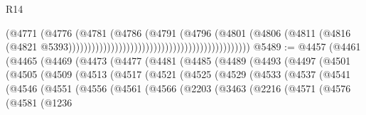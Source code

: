 \begin{lexlean}{R14}
\begin{coremodule}
                                                                            (@4771
                                                                              (@4776
                                                                                (@4781
                                                                                  (@4786
                                                                                    (@4791
                                                                                      (@4796
                                                                                        (@4801
                                                                                          (@4806
                                                                                            (@4811
                                                                                              (@4816
                                                                                                (@4821
                                                                                                  @5393)))))))))))))))))))))))))))))))))))))))))))))))
@5489 := @4457
    (@4461
      (@4465
        (@4469
          (@4473
            (@4477
              (@4481
                (@4485
                  (@4489
                    (@4493
                      (@4497
                        (@4501
                          (@4505
                            (@4509
                              (@4513
                                (@4517
                                  (@4521
                                    (@4525
                                      (@4529
                                        (@4533
                                          (@4537
                                            (@4541
                                              (@4546
                                                (@4551
                                                  (@4556
                                                    (@4561
                                                      (@4566
                                                        (@2203
                                                          (@3463
                                                            (@2216
                                                              (@4571
                                                                (@4576
                                                                  (@4581
                                                                    (@1236

\end{coremodule}
\end{lexlean}
